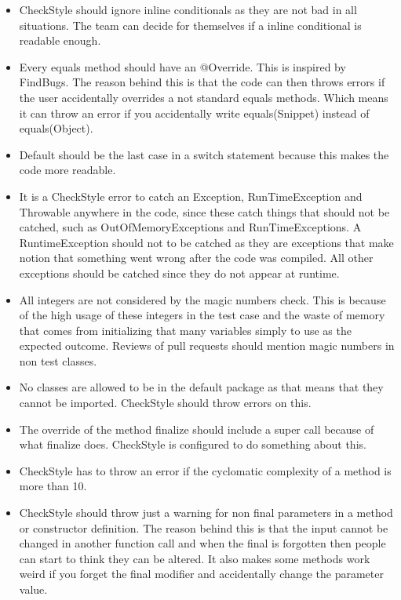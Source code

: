 \documentclass[11pt,a4paper]{report}
\begin{document}
\begin{itemize}

\item CheckStyle should ignore inline conditionals as they are not bad in all situations. The team can decide for themselves if a inline conditional is readable enough.

\item Every equals method should have an @Override. This is inspired by FindBugs. The reason behind this is that the code can then throws errors if the user accidentally overrides a not standard equals methods. Which means it can throw an error if you accidentally write equals(Snippet) instead of equals(Object).

\item Default should be the last case in a switch statement because this makes the code more readable.

\item It is a CheckStyle error to catch an Exception, RunTimeException and Throwable anywhere in the code, since these catch things that should not be catched, such as OutOfMemoryExceptions and RunTimeExceptions. A RuntimeException should not to be catched as they are exceptions that make notion that something went wrong after the code was compiled. All other exceptions should be catched since they do not appear at runtime. 

\item All integers are not considered by the magic numbers check. This is because of the high usage of these integers in the test case and the waste of memory that comes from initializing that many variables simply to use as the expected outcome. Reviews of pull requests should mention magic numbers in non test classes.

\item No classes are allowed to be in the default package as that means that they cannot be imported. CheckStyle should throw errors on this.

\item The override of the method finalize should include a super call because of what finalize does. CheckStyle is configured to do something about this.

\item CheckStyle has to throw an error if the cyclomatic complexity of a method is more than 10.

\item CheckStyle should throw just a warning for non final parameters in a method or constructor definition. The reason behind this is that the input cannot be changed in another function call and when the final is forgotten then people can start to think they can be altered. It also makes some methods work weird if you forget the final modifier and accidentally change the parameter value.


\end{itemize}
\end{document}
